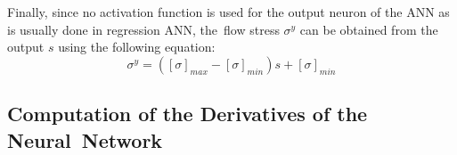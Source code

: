 \documentclass[algorithms,article,accept,pdftex,oneauthors]{Definitions/mdpi}
\begin{document}
Finally, since no activation function is used for the output neuron of the ANN as is usually done in regression ANN, the~flow stress $\sigma^y$ can be obtained from the output $s$ using the following equation:
\begin{equation}
\sigma^y =  \left([\sigma]_{max}-[\sigma]_{min}\right)s + [\sigma]_{min} \label{eq:CR2}
\end{equation}

\subsection{Computation of the Derivatives of the Neural~Network}\label{sec:ANN-derivative}
\end{document}
